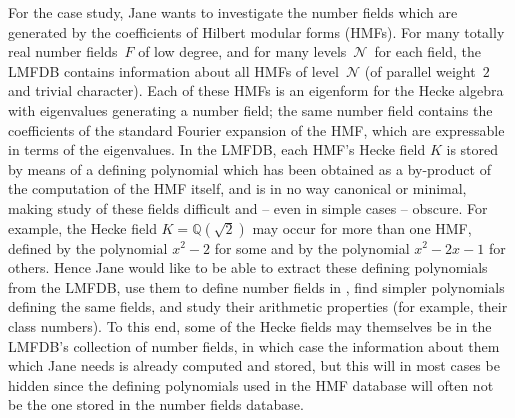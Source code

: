 \def\Q{{\mathbb Q}} \def\N{{\mathcal{N}}} For the \LMFDB case study, Jane wants to investigate the number fields which are generated by the coefficients of Hilbert modular forms (HMFs).  For many totally real number fields~$F$ of low degree, and for many levels~$\N$\ for each field, the LMFDB contains information about all HMFs of level~$\N$ (of parallel weight~$2$ and trivial character).  Each of these HMFs is an eigenform for the Hecke algebra with eigenvalues generating a number field; the same number field contains the coefficients of the standard Fourier expansion of the HMF, which are expressable in terms of the eigenvalues.  In the LMFDB, each HMF's Hecke field $K$ is stored by means of a defining polynomial which has been obtained as a by-product of the computation of the HMF itself, and is in no way canonical or minimal, making study of these fields difficult and -- even in simple cases -- obscure.  For example, the Hecke field $K=\Q(\sqrt{2})$ may occur for more than one HMF, defined by the polynomial $x^2-2$ for some and by the polynomial $x^2-2x-1$ for others.  Hence Jane would like to be able to extract these defining polynomials from the LMFDB, use them to define number fields in \Sage, find simpler polynomials defining the same fields, and study their arithmetic properties (for example, their class numbers).  To this end, some of the Hecke fields may themselves be in the LMFDB's collection of number fields, in which case the information about them which Jane needs is already computed and stored, but this will in most cases be hidden since the defining polynomials used in the HMF database will often not be the one stored in the number fields database.





